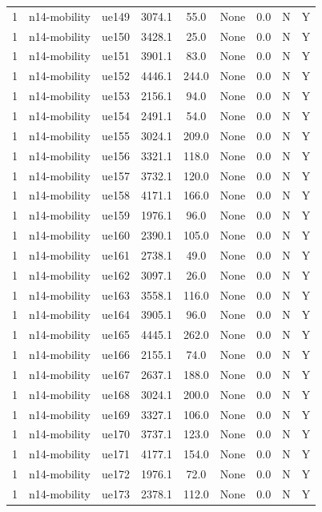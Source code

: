 \begin{table}[ht]
\begin{tabular}{|c|c|c|c|c|c|c|c|c|}
1 & n14-mobility & ue149 & 3074.1 & 55.0 & None & 0.0 & N & Y \\
1 & n14-mobility & ue150 & 3428.1 & 25.0 & None & 0.0 & N & Y \\
1 & n14-mobility & ue151 & 3901.1 & 83.0 & None & 0.0 & N & Y \\
1 & n14-mobility & ue152 & 4446.1 & 244.0 & None & 0.0 & N & Y \\
1 & n14-mobility & ue153 & 2156.1 & 94.0 & None & 0.0 & N & Y \\
1 & n14-mobility & ue154 & 2491.1 & 54.0 & None & 0.0 & N & Y \\
1 & n14-mobility & ue155 & 3024.1 & 209.0 & None & 0.0 & N & Y \\
1 & n14-mobility & ue156 & 3321.1 & 118.0 & None & 0.0 & N & Y \\
1 & n14-mobility & ue157 & 3732.1 & 120.0 & None & 0.0 & N & Y \\
1 & n14-mobility & ue158 & 4171.1 & 166.0 & None & 0.0 & N & Y \\
1 & n14-mobility & ue159 & 1976.1 & 96.0 & None & 0.0 & N & Y \\
1 & n14-mobility & ue160 & 2390.1 & 105.0 & None & 0.0 & N & Y \\
1 & n14-mobility & ue161 & 2738.1 & 49.0 & None & 0.0 & N & Y \\
1 & n14-mobility & ue162 & 3097.1 & 26.0 & None & 0.0 & N & Y \\
1 & n14-mobility & ue163 & 3558.1 & 116.0 & None & 0.0 & N & Y \\
1 & n14-mobility & ue164 & 3905.1 & 96.0 & None & 0.0 & N & Y \\
1 & n14-mobility & ue165 & 4445.1 & 262.0 & None & 0.0 & N & Y \\
1 & n14-mobility & ue166 & 2155.1 & 74.0 & None & 0.0 & N & Y \\
1 & n14-mobility & ue167 & 2637.1 & 188.0 & None & 0.0 & N & Y \\
1 & n14-mobility & ue168 & 3024.1 & 200.0 & None & 0.0 & N & Y \\
1 & n14-mobility & ue169 & 3327.1 & 106.0 & None & 0.0 & N & Y \\
1 & n14-mobility & ue170 & 3737.1 & 123.0 & None & 0.0 & N & Y \\
1 & n14-mobility & ue171 & 4177.1 & 154.0 & None & 0.0 & N & Y \\
1 & n14-mobility & ue172 & 1976.1 & 72.0 & None & 0.0 & N & Y \\
1 & n14-mobility & ue173 & 2378.1 & 112.0 & None & 0.0 & N & Y \\

\end{tabular}
\end{table}
